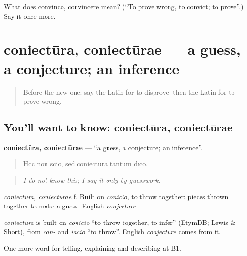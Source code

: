 \begin{tcolorbox}[breakable,colback=teal!4,colframe=teal!35!black,title={Before you move on}]
What does convincō, convincere mean? (\textquotedblleft{}To prove wrong, to convict; to prove\textquotedblright{}.) Say it once more.
\end{tcolorbox}
\section[coniectūra, coniectūrae]{coniectūra, coniectūrae — a guess, a conjecture; an inference}

\label{lesson:LA-C362-coniectura}



\begin{quote}
Before the new one: say the Latin for to disprove, then the Latin for to prove wrong.
\end{quote}

\subsection*{You'll want to know: coniectūra, coniectūrae}
\textbf{coniectūra, coniectūrae} — \textquotedblleft{}a guess, a conjecture; an inference\textquotedblright{}.

\begin{quote}
Hoc nōn sciō, sed coniectūrā tantum dīcō.
\end{quote}

\begin{quote}
\emph{I do not know this; I say it only by guesswork.}
\end{quote}

\emph{coniectūra, coniectūrae} f. Built on \emph{coniciō}, to throw together: pieces thrown together to make a guess. English \emph{conjecture}.

\begin{cousinweb}
\emph{coniectūra} is built on \emph{coniciō} \textquotedblleft{}to throw together, to infer\textquotedblright{} (EtymDB; Lewis \& Short), from \emph{con-} and \emph{iaciō} \textquotedblleft{}to throw\textquotedblright{}. English \emph{conjecture} comes from it.
\end{cousinweb}

\begin{grammarlens}[title={What you've built}]
One more word for telling, explaining and describing at B1.
\end{grammarlens}

